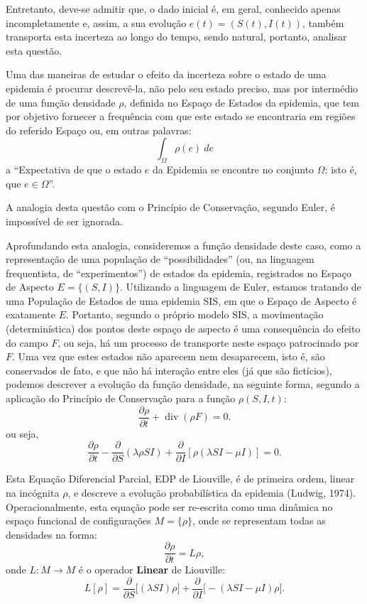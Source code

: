 Entretanto, deve-se admitir que, o dado inicial é, em geral, conhecido apenas incompletamente e, assim, a sua evolução \(e(t) = (S(t), I(t))\), também transporta esta incerteza ao longo do tempo, sendo natural, portanto, analisar esta questão.

Uma das maneiras de estudar o efeito da incerteza sobre o estado de uma epidemia é procurar descrevê-la, não pelo seu estado preciso, mas por intermédio de uma função densidade \(\rho\), definida no Espaço de Estados da epidemia, que tem por objetivo fornecer a frequência com que este estado se encontraria em regiões do referido Espaço ou, em outras palavras:
\begin{equation*}
\int_{\Omega} \rho(e)\ de
\end{equation*}
a ``Expectativa de que o estado \(e\) da Epidemia se encontre no conjunto \(\Omega\); isto é, que \(e \in \Omega\)''.

A analogia desta questão com o Princípio de Conservação, segundo Euler, é impossível de ser ignorada.

Aprofundando esta analogia, consideremos a função densidade deste caso, como a representação de uma população de ``possibilidades'' (ou, na linguagem frequentista, de ``experimentos'') de estados da epidemia, registrados no Espaço de Aspecto \(E = \{(S, I)\}\). Utilizando a linguagem de Euler, estamos tratando de uma População de Estados de uma epidemia SIS, em que o Espaço de Aspecto é exatamente \(E\). Portanto, segundo o próprio modelo SIS, a movimentação (determinística) dos pontos deste espaço de aspecto é uma consequência do efeito do campo \(F\), ou seja, há um processo de transporte neste espaço patrocinado por \(F\). Uma vez que estes estados não aparecem nem desaparecem, isto é, são conservados de fato, e que não há interação entre eles (já que são fictícios), podemos descrever a evolução da função densidade, na seguinte forma, segundo a aplicação do Princípio de Conservação para a função \(\rho(S, I, t)\):
\begin{equation}
\dfrac{\partial \rho}{\partial t} + \operatorname{div}(\rho F) = 0.
\end{equation}
ou seja,
\begin{equation}
\dfrac{\partial \rho}{\partial t} - \dfrac{\partial}{\partial S} (\lambda\rho SI) + \dfrac{\partial}{\partial I} [\rho (\lambda SI-\mu I)] = 0.
\end{equation}

Esta Equação Diferencial Parcial, EDP de Liouville, é de primeira ordem, linear na incógnita \(\rho\), e descreve a evolução probabilística da epidemia (Ludwig, 1974). Operacionalmente, esta equação pode ser re-escrita como uma dinâmica no espaço funcional de configurações \(M = \{\rho\}\), onde se representam todas as densidades na forma:
\[\dfrac{\partial \rho}{\partial t} = L\rho,\]
onde \(L: M \to M\) é o operador \textbf{Linear} de Liouville:
\begin{equation}
L[\rho] = \dfrac{\partial}{\partial S} \Big[(\lambda SI) \rho\Big] + \dfrac{\partial}{\partial I} \Big[-(\lambda SI-\mu I) \rho\Big].
\end{equation}

